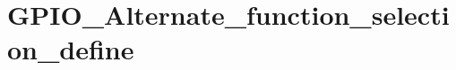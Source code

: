 \hypertarget{group___g_p_i_o___alternate__function__selection__define}{\section{G\-P\-I\-O\-\_\-\-Alternate\-\_\-function\-\_\-selection\-\_\-define}
\label{group___g_p_i_o___alternate__function__selection__define}
}
